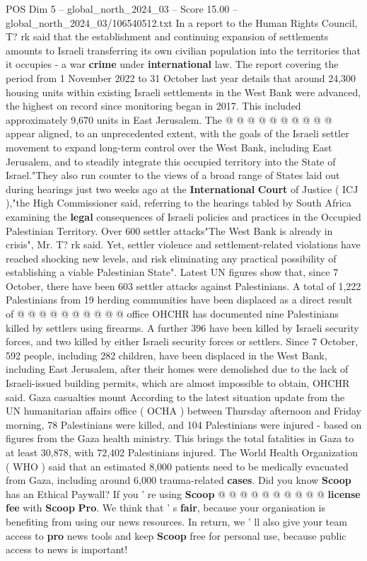 \begin{textsample}{POS Dim 5 – global\_north\_2024\_03 – Score 15.00 – global\_north\_2024\_03/106540512.txt}
In a report to the Human Rights Council, T? rk said that the establishment and continuing expansion of settlements amounts to Israeli transferring its own civilian population into the territories that it occupies - a war \textbf{crime} under \textbf{international} law.
The report covering the period from 1 November 2022 to 31 October last year details that around 24,300 housing units within existing Israeli settlements in the West Bank were advanced, the highest on record since monitoring began in 2017.
This included approximately 9,670 units in East Jerusalem.
The @ @ @ @ @ @ @ @ @ @ appear aligned, to an unprecedented extent, with the goals of the Israeli settler movement to expand long-term control over the West Bank, including East Jerusalem, and to steadily integrate this occupied territory into the State of Israel."They also run counter to the views of a broad range of States laid out during hearings just two weeks ago at the \textbf{International} \textbf{Court} of Justice ( ICJ ),"the High Commissioner said, referring to the hearings tabled by South Africa examining the \textbf{legal} consequences of Israeli policies and practices in the Occupied Palestinian Territory.
Over 600 settler attacks"The West Bank is already in crisis", Mr.
T? rk said.
Yet, settler violence and settlement-related violations have reached shocking new levels, and risk eliminating any practical possibility of establishing a viable Palestinian State".
Latest UN figures show that, since 7 October, there have been 603 settler attacks against Palestinians.
A total of 1,222 Palestinians from 19 herding communities have been displaced as a direct result of @ @ @ @ @ @ @ @ @ @ office OHCHR has documented nine Palestinians killed by settlers using firearms.
A further 396 have been killed by Israeli security forces, and two killed by either Israeli security forces or settlers.
Since 7 October, 592 people, including 282 children, have been displaced in the West Bank, including East Jerusalem, after their homes were demolished due to the lack of Israeli-issued building permits, which are almost impossible to obtain, OHCHR said.
Gaza casualties mount According to the latest situation update from the UN humanitarian affairs office ( OCHA ) between Thursday afternoon and Friday morning, 78 Palestinians were killed, and 104 Palestinians were injured - based on figures from the Gaza health ministry.
This brings the total fatalities in Gaza to at least 30,878, with 72,402 Palestinians injured.
The World Health Organization ( WHO ) said that an estimated 8,000 patients need to be medically evacuated from Gaza, including around 6,000 trauma-related \textbf{cases}.
Did you know \textbf{Scoop} has an Ethical Paywall?
If you ' re using \textbf{Scoop} @ @ @ @ @ @ @ @ @ @ \textbf{license} \textbf{fee} with \textbf{Scoop} \textbf{Pro}.
We think that ' s \textbf{fair}, because your organisation is benefiting from using our news resources.
In return, we ' ll also give your team access to \textbf{pro} news tools and keep \textbf{Scoop} free for personal use, because public access to news is important!


\end{textsample}
